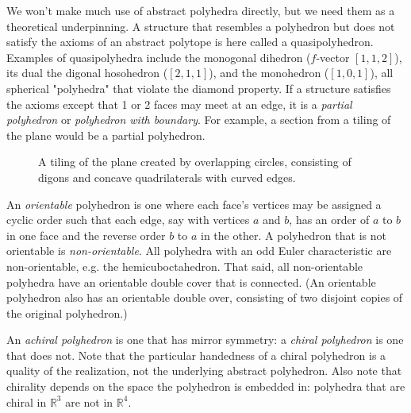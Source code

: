 \documentclass[12pt]{amsart}%
\begin{document}
We won't make much use of abstract polyhedra directly, but we need them as a
theoretical underpinning. A structure that resembles a polyhedron but does not
satisfy the axioms of an abstract polytope is here called a quasipolyhedron.
Examples of quasipolyhedra include the monogonal dihedron ($f$-vector
$[1,1,2]$), its dual the digonal hosohedron ($[2,1,1]$), and the monohedron
($[1,0,1]$), all spherical "polyhedra" that violate the diamond property.
If a structure satisfies the axioms except that 1 or 2 faces may meet at an
edge, it is a \textit{partial polyhedron} or \textit{polyhedron with
boundary}. For example, a section from a tiling of the plane would be a
partial polyhedron.

\begin{figure}[!htbp]
\caption{A tiling of the plane created by overlapping circles, consisting of
digons and concave quadrilaterals with curved edges.}
\label{fig:circlesquare}
\end{figure}

An \textit{orientable} polyhedron is one where each face's vertices may be
assigned a cyclic order such that each edge, say with vertices $a$ and $b$,
has an order of $a$ to $b$ in one face and the reverse order $b$ to $a$ in the
other. \cite{grunbaum94} A polyhedron that is not orientable is
\textit{non-orientable}. All polyhedra with an odd Euler characteristic are
non-orientable, e.g. the hemicuboctahedron. That said, all non-orientable
polyhedra have an orientable double cover that is connected. (An orientable
polyhedron also has an orientable double over, consisting of two disjoint
copies of the original polyhedron.)

An \textit{achiral polyhedron} is one that has mirror symmetry:
a \textit{chiral polyhedron} is one that does not. Note that the particular
handedness of a chiral polyhedron is a quality of the realization, not the
underlying abstract polyhedron.
Also note that chirality depends on the space the polyhedron is embedded in:
polyhedra that are chiral in $\mathbb{R}^3$ are not in $\mathbb{R}^4$.
\end{document}
